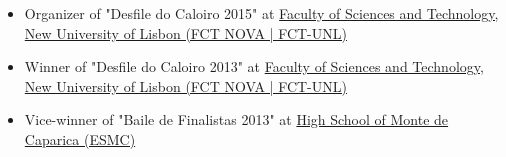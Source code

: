 \documentclass[10pt,a4paper,academicons]{altacv}
\begin{document}
\divider


\begin{itemize}
\item Organizer of "Desfile do Caloiro 2015" at \href{https://www.fct.unl.pt/}{Faculty of Sciences and Technology, New University of Lisbon (FCT NOVA | FCT-UNL)}
\item Winner of "Desfile do Caloiro 2013" at \href{https://www.fct.unl.pt/}{Faculty of Sciences and Technology, New University of Lisbon (FCT NOVA | FCT-UNL)}
\item Vice-winner of "Baile de Finalistas 2013" at \href{https://www.aecaparica.pt/escolas/escolas/escola-secundaria-do-monte-da-caparica/}{High School of Monte de Caparica (ESMC)}
\end{itemize}

\divider

\clearpage


\clearpage

\end{document}
